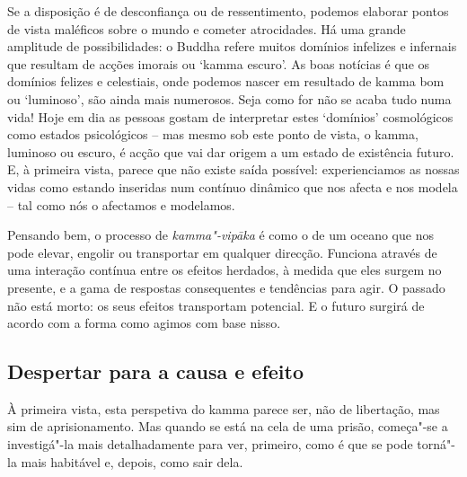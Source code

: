 Se a disposição é de desconfiança ou de ressentimento, podemos elaborar pontos de
vista maléficos sobre o mundo e cometer atrocidades. Há uma grande amplitude de
possibilidades: o Buddha refere muitos domínios infelizes e infernais que
resultam de acções imorais ou `kamma escuro'. As boas notícias é que os domínios
felizes e celestiais, onde podemos nascer em resultado de kamma bom ou
`luminoso', são ainda mais numerosos.
Seja como for não se acaba tudo
numa vida! Hoje em dia as pessoas gostam de interpretar estes `domínios'
cosmológicos como estados psicológicos -- mas mesmo sob este ponto de vista, o
kamma, luminoso ou escuro, é acção que vai dar origem a um estado de existência
futuro. E, à primeira vista, parece que não existe saída possível:
experienciamos as nossas vidas como estando inseridas num contínuo dinâmico que
nos afecta e nos modela -- tal como nós o afectamos e modelamos.

Pensando bem, o processo de \emph{kamma"-vipāka} é como o de um oceano que nos
pode elevar, engolir ou transportar em qualquer direcção. Funciona através de
uma interação contínua entre os efeitos herdados, à medida que eles surgem no
presente, e a gama de respostas consequentes e tendências para agir. O passado
não está morto: os seus efeitos transportam potencial. E o futuro surgirá de
acordo com a forma como agimos com base nisso.

\subsection{Despertar para a causa e efeito}

À primeira vista, esta perspetiva do kamma parece ser, não de libertação, mas
sim de aprisionamento. Mas quando se está na cela de uma prisão, começa"-se a
investigá"-la mais detalhadamente para ver, primeiro, como é que se pode torná"-la
mais habitável e, depois, como sair dela.

